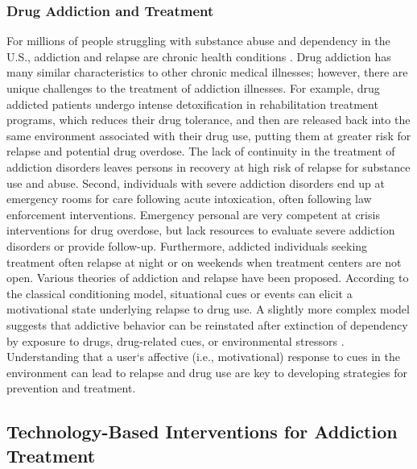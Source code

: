 \documentclass[sigconf]{acmart}
\begin{document}
\subsubsection{Drug Addiction and Treatment}

For millions of people struggling with substance abuse and dependency in 
the U.S., addiction and relapse are chronic health conditions \cite{boyer10}. 
Drug addiction has many similar characteristics to other chronic medical 
illnesses; however, there are unique challenges to the treatment of addiction
illnesses. For example, drug addicted patients undergo intense detoxification 
in rehabilitation treatment programs, which reduces their drug tolerance, and 
then are released back into the same environment associated with their drug use, 
putting them at greater risk for relapse and potential drug overdose. The lack 
of continuity in the treatment of addiction disorders leaves persons in recovery 
at high risk of relapse for substance use and abuse. Second, individuals with 
severe addiction disorders end up at emergency rooms for care following acute 
intoxication, often following law enforcement interventions. Emergency personal 
are very competent at crisis interventions for drug overdose, but lack resources 
to evaluate severe addiction disorders or provide follow-up. Furthermore, 
addicted individuals seeking treatment often relapse at night or on weekends 
when treatment centers are not open. Various theories of addiction and relapse 
have been proposed. According to the classical conditioning model, situational 
cues or events can elicit a motivational state underlying relapse to drug use. 
A slightly more complex model suggests that addictive behavior can be reinstated 
after extinction of dependency by exposure to drugs, drug-related cues, or 
environmental stressors \cite{shaham03}. Understanding that a user`s affective
(i.e., motivational) response to cues in the environment can lead to relapse 
and drug use are key to developing strategies for prevention and treatment. 

\subsection{Technology-Based Interventions for Addiction Treatment}
\end{document}
